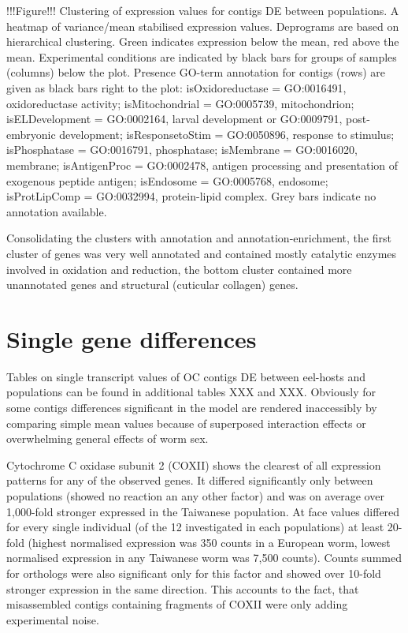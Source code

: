 \documentclass[10pt]{article}
\begin{document}
!!!Figure!!! Clustering of expression values for contigs DE between
populations. A heatmap of variance/mean stabilised expression
values. Deprograms are based on hierarchical clustering. Green
indicates expression below the mean, red above the mean. Experimental
conditions are indicated by black bars for groups of samples (columns)
below the plot. Presence GO-term annotation for contigs (rows) are
given as black bars right to the plot: isOxidoreductase = GO:0016491,
oxidoreductase activity; isMitochondrial = GO:0005739, mitochondrion;
isELDevelopment = GO:0002164, larval development or GO:0009791,
post-embryonic development; isResponsetoStim = GO:0050896, response to
stimulus; isPhosphatase = GO:0016791, phosphatase; isMembrane =
GO:0016020, membrane; isAntigenProc = GO:0002478, antigen processing
and presentation of exogenous peptide antigen; isEndosome =
GO:0005768, endosome; isProtLipComp = GO:0032994, protein-lipid
complex. Grey bars indicate no annotation available.

Consolidating the clusters with annotation and annotation-enrichment,
the first cluster of genes was very well annotated and contained
mostly catalytic enzymes involved in oxidation and reduction, the
bottom cluster contained more unannotated genes and structural
(cuticular collagen) genes.

\section{Single gene differences}
\label{sec:single-gene-diff}

Tables on single transcript values of OC contigs DE between eel-hosts
and populations can be found in additional tables XXX and
XXX. Obviously for some contigs differences significant in the model
are rendered inaccessibly by comparing simple mean values because of
superposed interaction effects or overwhelming general effects of worm
sex.

Cytochrome C oxidase subunit 2 (COXII) shows the clearest of all
expression patterns for any of the observed genes. It differed
significantly only between populations (showed no reaction an any
other factor) and was on average over 1,000-fold stronger expressed in
the Taiwanese population. At face values differed for every single
individual (of the 12 investigated in each populations) at least
20-fold (highest normalised expression was 350 counts in a European
worm, lowest normalised expression in any Taiwanese worm was 7,500
counts). Counts summed for orthologs were also significant only for
this factor and showed over 10-fold stronger expression in the same
direction. This accounts to the fact, that misassembled contigs
containing fragments of COXII were only adding experimental noise.
\end{document}

